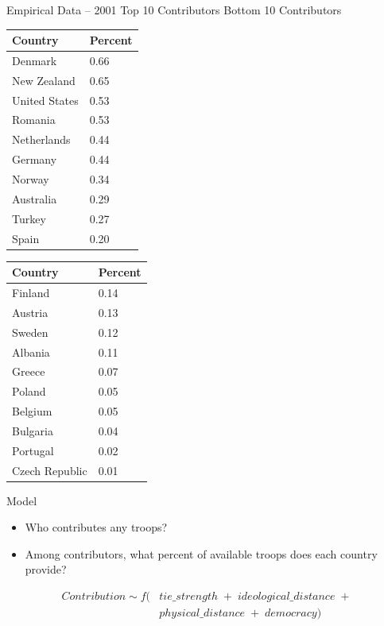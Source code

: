 \documentclass[11pt]{beamer}
\begin{document}
\begin{frame}{Empirical Data -- 2001}
Top 10 Contributors
\quad
\quad
\quad
\quad
\quad
\quad
\;
Bottom 10 Contributors \\
\begin{tabular}{ll}
\hline
\textbf{Country} & \textbf{Percent} \\ \hline
Denmark          & 0.66             \\
New Zealand      & 0.65             \\
United States    & 0.53             \\
Romania          & 0.53             \\
Netherlands      & 0.44             \\
Germany          & 0.44             \\
Norway           & 0.34             \\
Australia        & 0.29             \\
Turkey           & 0.27             \\
Spain            & 0.20             \\ \hline
\end{tabular}
\quad
\quad
\quad
\;
\begin{tabular}{ll}
\hline
\textbf{Country} & \textbf{Percent} \\ \hline
Finland          & 0.14             \\
Austria          & 0.13             \\
Sweden           & 0.12             \\
Albania          & 0.11             \\
Greece           & 0.07             \\
Poland           & 0.05             \\
Belgium          & 0.05             \\
Bulgaria         & 0.04             \\
Portugal         & 0.02             \\
Czech Republic   & 0.01             \\ \hline
\end{tabular}
\end{frame}

\begin{frame}{Model}
  \begin{itemize}
    \item Who contributes any troops?
    \item Among contributors, what percent of available troops does each country provide?
  \end{itemize}

  \begin{align*}
    Contribution \sim f(& tie\_strength \; + \; ideological\_distance \; + \\
                        & physical\_distance \; + \;  democracy)
  \end{align*}

\end{frame}
\end{document}
